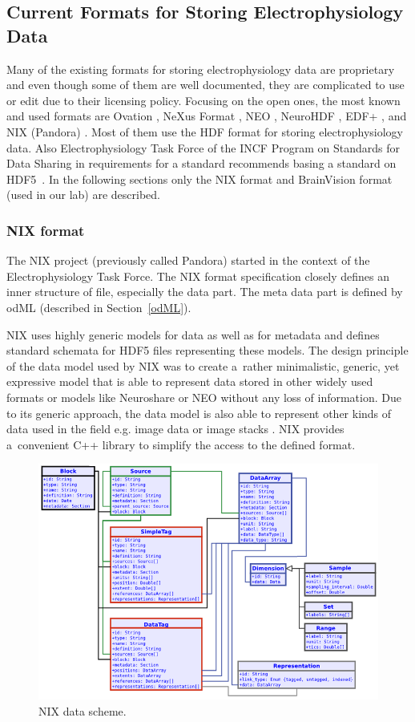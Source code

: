 \documentclass[conference]{IEEEtran}
\begin{document}
\subsection{Current Formats for Storing Electrophysiology Data}
Many of the existing formats for storing electrophysiology data are proprietary and even though some of them are well documented, they are complicated to use or edit due to their licensing policy. Focusing on the open ones, the most known and used formats are Ovation \cite{ovation}, NeXus Format \cite{nexus}, NEO \cite{neo}, NeuroHDF \cite{neurohdf}, EDF+ \cite{kemp2003}, and NIX (Pandora) \cite{pandora}. Most of them use the HDF format for storing electrophysiology data. Also Electrophysiology Task Force of the INCF Program on Standards for Data Sharing in requirements for a standard recommends basing a standard on HDF5~\cite{requirements}. In the following sections only the NIX format and BrainVision format (used in our lab) are described.

\subsubsection{NIX format}
\label{nixsection}
The NIX project (previously called Pandora) started in the context of the Electrophysiology Task Force. The NIX format specification closely defines an inner structure of file, especially the data part. The meta data part is defined by odML (described in Section~\ref{odML}).

NIX uses highly generic models for data as well as for metadata and defines standard schemata for HDF5 files representing these models. The design principle of the data model used by NIX was to create a~rather minimalistic, generic, yet expressive model that is able to represent data stored in other widely used formats or models like Neuroshare or NEO without any loss of information. Due to its generic approach, the data model is also able to represent other kinds of data used in the field e.g. image data or image stacks \cite{pandora}. NIX provides a~convenient C++ library to simplify the access to the defined format.

\begin{figure}[h]
	\centering
	\includegraphics[scale=0.9]{obrazky/NIX_scheme.png}
	\caption{NIX data scheme. \cite{pandora}}
	\label{NIX_scheme}
\end{figure}
\end{document}
